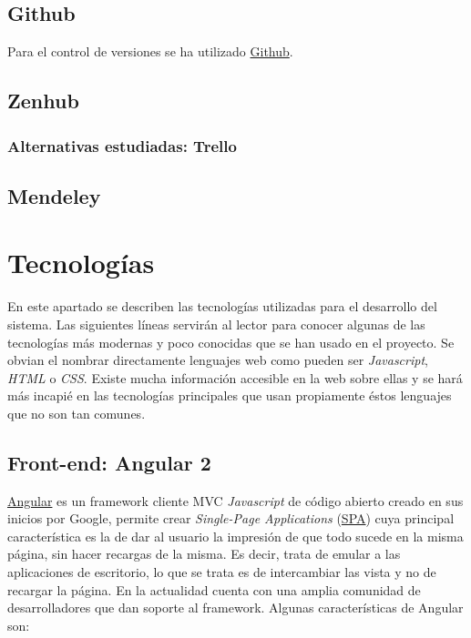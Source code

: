    \subsection{Github}\label{github}
   Para el control de versiones se ha utilizado \hyperlink{https://www.github.com/}{Github}. 
   
    \subsection{Zenhub}\label{zenhub}
    
     \subsubsection{Alternativas estudiadas: Trello}\label{trello}
     
      \subsection{Mendeley}\label{mendeley}

\section{Tecnologías}\label{tecnologias}
 En este apartado se describen las tecnologías utilizadas para el desarrollo del sistema. Las siguientes líneas servirán al lector para conocer algunas de las tecnologías más modernas y poco conocidas que se han usado en el proyecto. Se obvian el nombrar directamente lenguajes web como pueden ser \emph{Javascript}, \emph{HTML} o \emph{CSS}. Existe mucha información accesible en la web sobre ellas y se hará más incapié en las tecnologías principales que usan propiamente éstos lenguajes que no son tan comunes.
 
 \subsection{Front-end: Angular 2}\label{tecnologias-angular}
 \hyperlink{https://angular.io}{Angular} es un framework cliente MVC \emph{Javascript} de código abierto creado en sus inicios por Google, permite crear  \emph{Single-Page Applications} (\hyperlink{https://es.wikipedia.org/wiki/Single-page_application}{SPA})  cuya principal característica es la de dar al usuario la impresión de que todo sucede en la misma página, sin hacer recargas de la misma. Es decir, trata de emular a las aplicaciones de escritorio, lo que se trata es de intercambiar las vista y no de recargar la página. En la actualidad cuenta con una amplia comunidad de desarrolladores  que dan soporte al framework.  Algunas características de Angular son:
 
